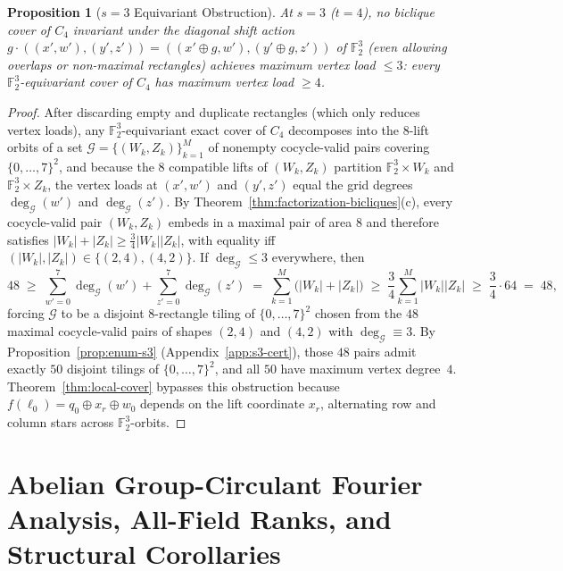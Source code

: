 \documentclass[11pt,reqno]{amsart}
\newtheorem{proposition}[theorem]{Proposition}
\theoremstyle{definition}
\theoremstyle{remark}
\newcommand{\FF}{\mathbb{F}}
\numberwithin{equation}{section}
\begin{document}
\begin{proposition}[$s = 3$ Equivariant Obstruction]
  \label{prop:s3-obstruction}
  At $s = 3$ ($t = 4$), no biclique cover of $C_4$ invariant under the diagonal shift action $g \cdot ((x', w'), (y', z')) = ((x' \oplus g, w'), (y' \oplus g, z'))$ of $\FF_2^3$ (even allowing overlaps or non-maximal rectangles) achieves maximum vertex load $\le 3$: every $\FF_2^3$-equivariant cover of $C_4$ has maximum vertex load $\ge 4$.
\end{proposition}

\begin{proof}
After discarding empty and duplicate rectangles (which only reduces vertex loads), any $\FF_2^3$-equivariant exact cover of $C_4$ decomposes into the $8$-lift orbits of a set $\mathcal{G} = \{(W_k, Z_k)\}_{k=1}^M$ of nonempty cocycle-valid pairs covering $\{0, \dots, 7\}^2$, and because the $8$ compatible lifts of $(W_k, Z_k)$ partition $\FF_2^3 \times W_k$ and $\FF_2^3 \times Z_k$, the vertex loads at $(x', w')$ and $(y', z')$ equal the grid degrees $\deg_{\mathcal{G}}(w')$ and $\deg_{\mathcal{G}}(z')$. By Theorem~\ref{thm:factorization-bicliques}(c), every cocycle-valid pair $(W_k, Z_k)$ embeds in a maximal pair of area $8$ and therefore satisfies $|W_k| + |Z_k| \ge \frac{3}{4}|W_k||Z_k|$, with equality iff $(|W_k|, |Z_k|) \in \{(2, 4), (4, 2)\}$. If $\deg_{\mathcal{G}} \le 3$ everywhere, then
\[
  48 \;\ge\; \sum_{w'=0}^7 \deg_{\mathcal{G}}(w') + \sum_{z'=0}^7 \deg_{\mathcal{G}}(z')
  \;=\; \sum_{k=1}^M \bigl(|W_k| + |Z_k|\bigr)
  \;\ge\; \frac{3}{4}\sum_{k=1}^M |W_k||Z_k|
  \;\ge\; \frac{3}{4}\cdot 64 \;=\; 48,
\]
forcing $\mathcal{G}$ to be a disjoint $8$-rectangle tiling of $\{0, \dots, 7\}^2$ chosen from the $48$ maximal cocycle-valid pairs of shapes $(2, 4)$ and $(4, 2)$ with $\deg_{\mathcal{G}} \equiv 3$. By Proposition~\ref{prop:enum-s3} (Appendix~\ref{app:s3-cert}), those $48$ pairs admit exactly $50$ disjoint tilings of $\{0, \dots, 7\}^2$, and all $50$ have maximum vertex degree~$4$. Theorem~\ref{thm:local-cover} bypasses this obstruction because $f(\ell_0) = q_0 \oplus x_r \oplus w_0$ depends on the lift coordinate $x_r$, alternating row and column stars across $\FF_2^3$-orbits.
\end{proof}

\section{Abelian Group-Circulant Fourier Analysis, All-Field Ranks, and Structural Corollaries}
\label{sec:fourier}
\end{document}
